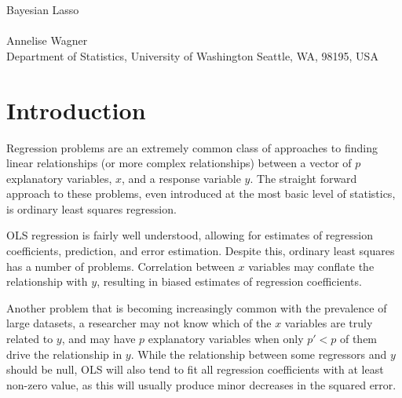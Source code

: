 \documentclass{uwstat572}
\begin{document}

\begin{center}
  {\LARGE Bayesian Lasso}\\\ \\
  {Annelise Wagner \\ 
    Department of Statistics, University of Washington Seattle, WA, 98195, USA
  }
\end{center}



\begin{abstract}
  The Bayesian Lasso, building on the interpretation of Tibshirani, places Laplace priors on linear regression coefficients to allow for Bayesian approaches to parameter and error estimation. An efficient Gibbs sampler allows for quick computation and may be exanded to other forms of penalized regression.
\end{abstract}

\section{Introduction}\label{Introduction}
Regression problems are an extremely common class of approaches to finding linear relationships (or more complex relationships) between a vector of $p$ explanatory variables, $x$, and a response variable $y$. The straight forward approach to these problems, even introduced at the most basic level of statistics, is ordinary least squares regression. 

OLS regression is fairly well understood, allowing for estimates of regression coefficients, prediction, and error estimation. Despite this, ordinary least squares has a number of problems. Correlation between $x$ variables may conflate the relationship with $y$, resulting in biased estimates of regression coefficients.

Another problem that is becoming increasingly common with the prevalence of large datasets, a researcher may not know which of the $x$ variables are truly related to $y$, and may have $p$ explanatory variables when only $p'<p$ of them drive the relationship in $y$. While the relationship between some regressors and $y$ should be null, OLS will also tend to fit all regression coefficients with at least non-zero value, as this will usually produce minor decreases in the squared error.\cite{seeger2008bayesian}
\end{document}
